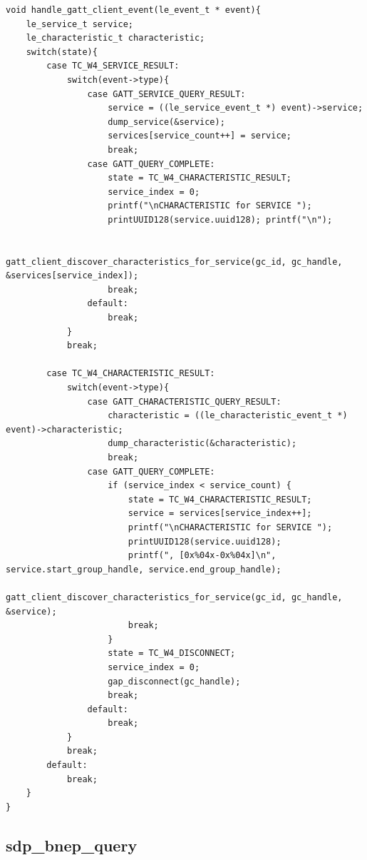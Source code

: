 \documentclass[a4paper,titlepage,oneside,12pt]{amsart} %
\begin{document}
\begin{lstlisting}[float, caption=GATT client queries handling., label=code:gattBrowserQueryHandler]
void handle_gatt_client_event(le_event_t * event){
    le_service_t service;
    le_characteristic_t characteristic;
    switch(state){
        case TC_W4_SERVICE_RESULT:
            switch(event->type){
                case GATT_SERVICE_QUERY_RESULT:
                    service = ((le_service_event_t *) event)->service;
                    dump_service(&service);
                    services[service_count++] = service;
                    break;
                case GATT_QUERY_COMPLETE:
                    state = TC_W4_CHARACTERISTIC_RESULT;
                    service_index = 0;
                    printf("\nCHARACTERISTIC for SERVICE ");
                    printUUID128(service.uuid128); printf("\n");
                    
                    gatt_client_discover_characteristics_for_service(gc_id, gc_handle, &services[service_index]);
                    break;
                default:
                    break;
            }
            break;
            
        case TC_W4_CHARACTERISTIC_RESULT:
            switch(event->type){
                case GATT_CHARACTERISTIC_QUERY_RESULT:
                    characteristic = ((le_characteristic_event_t *) event)->characteristic;
                    dump_characteristic(&characteristic);
                    break;
                case GATT_QUERY_COMPLETE:
                    if (service_index < service_count) {
                        state = TC_W4_CHARACTERISTIC_RESULT;
                        service = services[service_index++];
                        printf("\nCHARACTERISTIC for SERVICE ");
                        printUUID128(service.uuid128);
                        printf(", [0x%04x-0x%04x]\n", service.start_group_handle, service.end_group_handle);
                        gatt_client_discover_characteristics_for_service(gc_id, gc_handle, &service);
                        break;
                    }
                    state = TC_W4_DISCONNECT;
                    service_index = 0;
                    gap_disconnect(gc_handle);
                    break;
                default:
                    break;
            }
            break;
        default:
            break;
    }
}
\end{lstlisting}




\subsection{sdp\_bnep\_query}
\label{subsection:panudemo}
\end{document}
